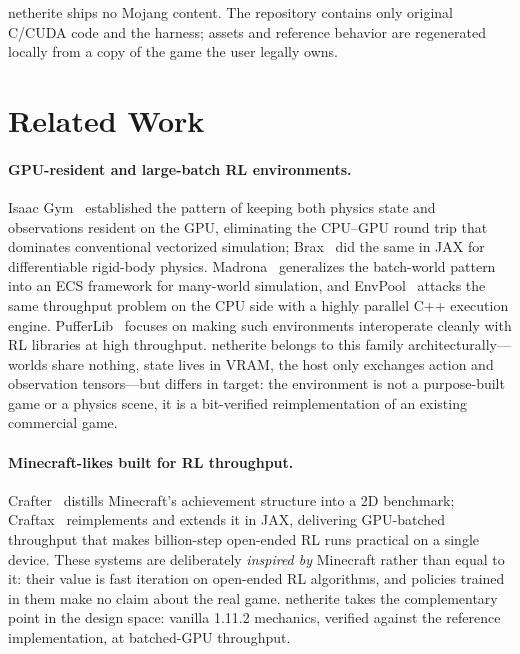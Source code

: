\documentclass[11pt]{article}
\begin{document}
netherite ships no Mojang content. The repository contains only original C/CUDA code and the harness; assets and reference behavior are regenerated locally from a copy of the game the user legally owns.

\section{Related Work}
\label{sec:related}

\paragraph{GPU-resident and large-batch RL environments.}
Isaac Gym~\citep{makoviychuk2021isaacgym} established the pattern of keeping both physics state and observations resident on the GPU, eliminating the CPU--GPU round trip that dominates conventional vectorized simulation; Brax~\citep{freeman2021brax} did the same in JAX for differentiable rigid-body physics. Madrona~\citep{shacklett2023madrona} generalizes the batch-world pattern into an ECS framework for many-world simulation, and EnvPool~\citep{weng2022envpool} attacks the same throughput problem on the CPU side with a highly parallel C++ execution engine. PufferLib~\citep{suarez2024pufferlib} focuses on making such environments interoperate cleanly with RL libraries at high throughput. netherite belongs to this family architecturally---worlds share nothing, state lives in VRAM, the host only exchanges action and observation tensors---but differs in target: the environment is not a purpose-built game or a physics scene, it is a bit-verified reimplementation of an existing commercial game.

\paragraph{Minecraft-likes built for RL throughput.}
Crafter~\citep{hafner2022crafter} distills Minecraft's achievement structure into a 2D benchmark; Craftax~\citep{matthews2024craftax} reimplements and extends it in JAX, delivering GPU-batched throughput that makes billion-step open-ended RL runs practical on a single device. These systems are deliberately \emph{inspired by} Minecraft rather than equal to it: their value is fast iteration on open-ended RL algorithms, and policies trained in them make no claim about the real game. netherite takes the complementary point in the design space: vanilla 1.11.2 mechanics, verified against the reference implementation, at batched-GPU throughput.
\end{document}
